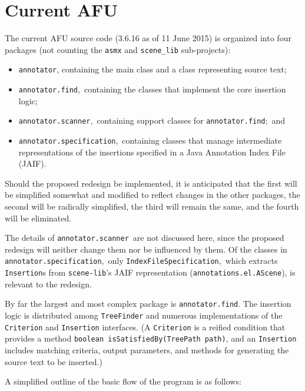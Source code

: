 \documentclass{article}
\begin{document}
\section{Current AFU}

The current AFU source code (3.6.16 as of 11 June 2015) is organized
into four packages (not counting the \texttt{asmx} and
\texttt{scene\_lib} sub-projects):
\begin{itemize}
\item  \texttt{annotator}, containing the main class and a class
representing source text;
\item  \texttt{annotator.find},\ containing the classes that implement
the core insertion logic;
\item  \texttt{annotator.scanner},\ containing support classes for
\texttt{annotator.find};\ and
\item  \texttt{annotator.specification},\ containing classes that
manage intermediate representations of the insertions specified in a
Java Annotation Index File (JAIF).
\end{itemize}
Should the proposed redesign be implemented, it is anticipated that the
first will be simplified somewhat and modified to reflect changes in the
other packages, the second will be radically simplified, the third will
remain the same, and the fourth will be eliminated.

The details of \texttt{annotator.scanner}\ are not discussed here, since
the proposed redesign will neither change them nor be influenced by
them.  Of the classes in \texttt{annotator.specification},\ only
\texttt{IndexFileSpecification},\ which extracts \texttt{Insertion}s
from \texttt{scene-lib}'s JAIF representation
(\texttt{annotations.el.AScene}), is relevant to the redesign.

By far the largest and most complex package is \texttt{annotator.find}.
The insertion logic is distributed among \texttt{TreeFinder} and
numerous implementations of the \texttt{Criterion} and
\texttt{Insertion} interfaces.  (A \texttt{Criterion} is a reified
condition that provides a method
\texttt{boolean isSatisfiedBy(TreePath path)},
and an \texttt{Insertion} includes matching criteria, output parameters,
and methods for generating the source text to be inserted.)

A simplified outline of the basic flow of the program is as follows:
\end{document}
